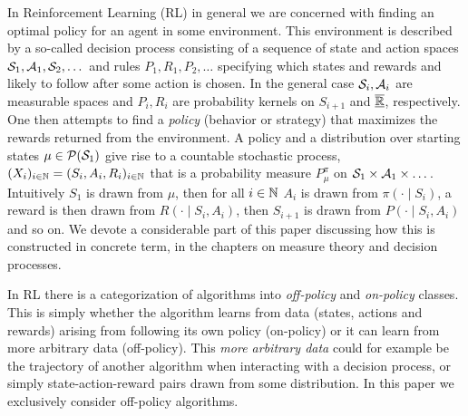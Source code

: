 
In Reinforcement Learning (RL) in general
we are concerned with finding an optimal policy
for an agent in some environment.
This environment is described by a so-called decision process
consisting of a sequence of state and action spaces
$\mathcal{S}_1, \mathcal{A}_1, \mathcal{S}_2, \dots$
and rules $P_1, R_1, P_2, \dots$ specifying which states and rewards
and likely to follow after some action is chosen.
In the general case $\mathcal{S}_i, \mathcal{A}_i$ are measurable spaces
and $P_i, R_i$ are probability kernels on $S_{i+1}$ and $\overline{\underline{\mathbb{R}}}$, respectively.
One then attempts to find a \emph{policy} (behavior or strategy) that
maximizes the rewards returned from the environment.
A policy and a distribution over starting states
$\mu \in \mathcal{P}(\mathcal{S}_1)$
give rise to a countable stochastic process,
$ (X_i)_{i\in \mathbb{N}} = (S_i, A_i, R_i)_{i\in \mathbb{N}}$ 
that is a probability measure $P^\pi_\mu$ on
$\mathcal{S}_1 \times \mathcal{A}_1 \times \dots$.
Intuitively $S_1$ is drawn from $\mu$,
then for all $i \in \mathbb{N}$
$A_i$ is drawn from $\pi(\cdot \mid S_i)$,
a reward is then drawn from $R(\cdot \mid S_i, A_i)$,
then $S_{i+1}$ is drawn from $P(\cdot \mid S_i, A_i)$ and so on.
We devote a considerable part of this paper discussing how this is 
constructed in concrete term, in the chapters on measure theory
and decision processes. 



In RL there is a categorization of algorithms into
\emph{off-policy} and \emph{on-policy} classes.
This is simply whether the algorithm learns from data
(states, actions and rewards) arising from 
following its own policy (on-policy) or it can learn from more
arbitrary data (off-policy).
This \emph{more arbitrary data} could for example be
the trajectory of another algorithm when interacting with a decision process,
or simply state-action-reward pairs drawn from some distribution.
In this paper we exclusively consider off-policy algorithms.

